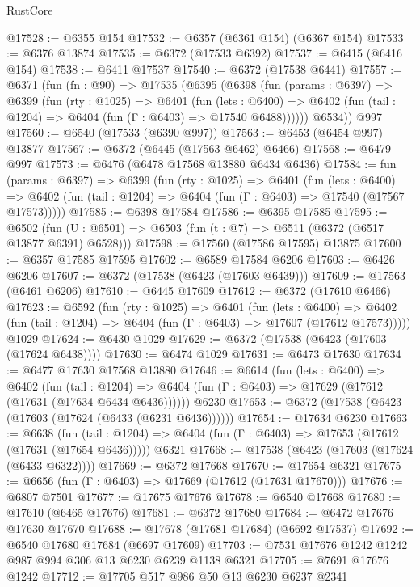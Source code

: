 \begin{lexlean}{RustCore}
\begin{coremodule}
@17528 := @6355 @154
@17532 := @6357 (@6361 @154) (@6367 @154)
@17533 := @6376 @13874
@17535 := @6372 (@17533 @6392)
@17537 := @6415 (@6416 @154)
@17538 := @6411 @17537
@17540 := @6372 (@17538 @6441)
@17557 := @6371
    (fun (fn : @90) =>
    @17535
      (@6395
        (@6398
          (fun (params : @6397) =>
          @6399
            (fun (rty : @1025) =>
            @6401
              (fun (lets : @6400) =>
              @6402 (fun (tail : @1204) => @6404 (fun (Γ : @6403) => @17540 @6488))))))
        @6534))
    @997
@17560 := @6540 (@17533 (@6390 @997))
@17563 := @6453 (@6454 @997) @13877
@17567 := @6372 (@6445 (@17563 @6462) @6466)
@17568 := @6479 @997
@17573 := @6476 (@6478 @17568 @13880 @6434 @6436)
@17584 := fun (params : @6397) =>
  @6399
    (fun (rty : @1025) =>
    @6401
      (fun (lets : @6400) =>
      @6402 (fun (tail : @1204) => @6404 (fun (Γ : @6403) => @17540 (@17567 @17573)))))
@17585 := @6398 @17584
@17586 := @6395 @17585
@17595 := @6502
    (fun (U : @6501) => @6503 (fun (t : @7) => @6511 (@6372 (@6517 @13877 @6391) @6528)))
@17598 := @17560 (@17586 @17595) @13875
@17600 := @6357 @17585 @17595
@17602 := @6589 @17584 @6206
@17603 := @6426 @6206
@17607 := @6372 (@17538 (@6423 (@17603 @6439)))
@17609 := @17563 (@6461 @6206)
@17610 := @6445 @17609
@17612 := @6372 (@17610 @6466)
@17623 := @6592
    (fun (rty : @1025) =>
    @6401
      (fun (lets : @6400) =>
      @6402 (fun (tail : @1204) => @6404 (fun (Γ : @6403) => @17607 (@17612 @17573)))))
    @1029
@17624 := @6430 @1029
@17629 := @6372 (@17538 (@6423 (@17603 (@17624 @6438))))
@17630 := @6474 @1029
@17631 := @6473 @17630
@17634 := @6477 @17630 @17568 @13880
@17646 := @6614
    (fun (lets : @6400) =>
    @6402
      (fun (tail : @1204) =>
      @6404 (fun (Γ : @6403) => @17629 (@17612 (@17631 (@17634 @6434 @6436))))))
    @6230
@17653 := @6372 (@17538 (@6423 (@17603 (@17624 (@6433 (@6231 @6436))))))
@17654 := @17634 @6230
@17663 := @6638
    (fun (tail : @1204) => @6404 (fun (Γ : @6403) => @17653 (@17612 (@17631 (@17654 @6436)))))
    @6321
@17668 := @17538 (@6423 (@17603 (@17624 (@6433 @6322))))
@17669 := @6372 @17668
@17670 := @17654 @6321
@17675 := @6656 (fun (Γ : @6403) => @17669 (@17612 (@17631 @17670)))
@17676 := @6807 @7501
@17677 := @17675 @17676
@17678 := @6540 @17668
@17680 := @17610 (@6465 @17676)
@17681 := @6372 @17680
@17684 := @6472 @17676 @17630 @17670
@17688 := @17678 (@17681 @17684) (@6692 @17537)
@17692 := @6540 @17680 @17684 (@6697 @17609)
@17703 := @7531 @17676 @1242 @1242 @987 @994 @306 @13 @6230 @6239 @1138 @6321
@17705 := @7691 @17676 @1242
@17712 := @17705 @517 @986 @50 @13 @6230 @6237 @2341

\end{coremodule}
\end{lexlean}
